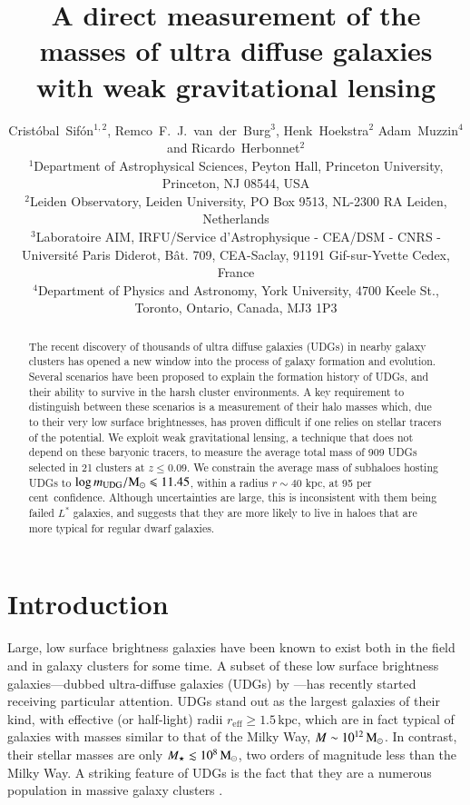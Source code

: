 \documentclass[usenatbib,fleqn]{mnras}
\title[Weak lensing masses of UDGs]
      {A direct measurement of the masses of ultra diffuse galaxies with weak gravitational lensing}
\author[C.\ Sif\'on, R.\ F.\ J.\ van der Burg, H.\ Hoekstra, A.\ Muzzin \& R.\ Herbonnet]
  {
      Crist\'obal~Sif\'on$^{1,2}$,
      Remco~F.~J.~van~der~Burg$^3$,
      Henk~Hoekstra$^2$
      Adam~Muzzin$^4$
      and
      \newauthor
      Ricardo~Herbonnet$^2$
\\
      $^1$Department of Astrophysical Sciences, Peyton Hall, Princeton University, Princeton, NJ 08544, USA\\
      $^2$Leiden Observatory, Leiden University, PO Box 9513, NL-2300 RA Leiden, Netherlands\\
      $^3$Laboratoire AIM, IRFU/Service d'Astrophysique - CEA/DSM - CNRS - Universit\'e Paris Diderot, B\^at. 709, CEA-Saclay, 91191 Gif-sur-Yvette Cedex, France\\
      $^4$Department of Physics and Astronomy, York University, 4700 Keele St., Toronto, Ontario, Canada, MJ3 1P3
  }
\def\percent{ per cent}
\def\reff{r_\mathrm{eff}}
\begin{document}
\label{firstpage}
\pagerange{\pageref{firstpage}--\pageref{lastpage}}

\maketitle

\begin{abstract}
        The recent discovery of thousands of ultra diffuse galaxies (UDGs) in nearby galaxy clusters has opened a new window into the process of galaxy formation and evolution. Several scenarios have been proposed to explain the formation history of UDGs, and their ability to survive in the harsh cluster environments. A key requirement to distinguish between these scenarios is a measurement of their halo masses which, due to their very low surface brightnesses, has proven difficult if one relies on stellar tracers of the potential. We exploit weak gravitational lensing, a technique that does not depend on these baryonic tracers, to measure the average total mass of 909 UDGs selected in 21 clusters at $z\leq0.09$. We constrain the average mass of subhaloes hosting UDGs to $\log m_{\rm UDG}/\mathrm{M}_\odot\leqslant11.45$, within a radius $r\sim40$ kpc, at 95\percent\ confidence. Although uncertainties are large, this is inconsistent with them being failed $L^*$ galaxies, and suggests that they are more likely to live in haloes that are more typical for regular dwarf galaxies.
\end{abstract}

\section{Introduction}
\label{s:intro}

Large, low surface brightness galaxies have been known to exist both in the field \citep{dalcanton97} and in galaxy clusters \citep{impey88,turner93} for some time.
A subset of these low surface brightness galaxies---dubbed ultra-diffuse galaxies (UDGs) by \cite{vandokkum15_coma}---has recently started receiving particular attention. UDGs stand out as the largest galaxies of their kind, with effective (or half-light) radii $\reff\geq1.5\,\mathrm{kpc}$, which are in fact typical of galaxies with masses similar to that of the Milky Way, $M\sim10^{12}\,\mathrm{M}_\odot$. In contrast, their stellar masses are only $M_\star\lesssim10^8\,\mathrm{M}_\odot$, two orders of magnitude less than the Milky Way. A striking feature of UDGs is the fact that they are a numerous population in massive galaxy clusters \citep{vandokkum15_coma,koda15,mihos15,yagi16,vdburg16}.
\end{document}
